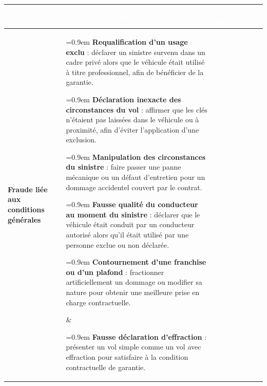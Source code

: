 \begin{table}[H]
    \centering
    \renewcommand{\arraystretch}{1.3}
    \setlength{\extrarowheight}{2pt}
    \renewcommand\tabularxcolumn[1]{m{#1}}   %
    \newcommand{\padV}{6pt}                  %
    \newcommand{\hautCell}{\vspace*{\padV}}
    \newcommand{\basCell}{\vspace*{\dimexpr\padV-4pt\relax}} %
    \newcommand{\puce}[1]{%
        \leavevmode\hspace{0.3em}%
        \parbox[t]{\dimexpr\linewidth-0.9em\relax}{%
            \hangindent=0.9em\hangafter=1%
            \makebox[0.9em][l]{$\bullet$}#1\par}%
        \vspace{4pt}%
    }
    \begin{tabularx}{\textwidth}{%
        |>{\centering\arraybackslash}m{2.4cm}%
        |>{\raggedright\arraybackslash}X%
        |>{\raggedright\arraybackslash}X|}
        \hline
        \rowcolor{accenture}
        \textcolor{white}{\textbf{}} & \textcolor{white}{\textbf{Assurance automobile}} & \textcolor{white}{\textbf{Assurance habitation}} \\
        \hline
        \textbf{Fraude liée aux conditions générales}
        &
        \hautCell
        \puce{\textbf{Requalification d'un usage exclu} : déclarer un sinistre survenu dans un cadre privé alors que le véhicule était utilisé à titre professionnel, afin de bénéficier de la garantie.}
        \puce{\textbf{Déclaration inexacte des circonstances du vol} : affirmer que les clés n'étaient pas laissées dans le véhicule ou à proximité, afin d'éviter l'application d'une exclusion.}
        \puce{\textbf{Manipulation des circonstances du sinistre} : faire passer une panne mécanique ou un défaut d'entretien pour un dommage accidentel couvert par le contrat.}
        \puce{\textbf{Fausse qualité du conducteur au moment du sinistre} : déclarer que le véhicule était conduit par un conducteur autorisé alors qu'il était utilisé par une personne exclue ou non déclarée.}
        \puce{\textbf{Contournement d'une franchise ou d'un plafond} : fractionner artificiellement un dommage ou modifier sa nature pour obtenir une meilleure prise en charge contractuelle.}%
        \basCell
        &
        \hautCell
        \puce{\textbf{Fausse déclaration d'effraction} : présenter un vol simple comme un vol avec effraction pour satisfaire à la condition contractuelle de garantie.}

\end{tabularx}
\end{table}
